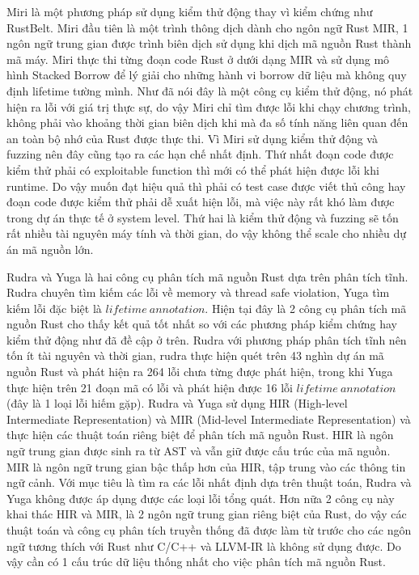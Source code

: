Miri là một phương pháp sử dụng kiểm thử động thay vì kiểm chứng như RustBelt.
Miri đầu tiên là một trình thông dịch dành cho ngôn ngữ Rust MIR, 1 ngôn ngữ trung gian được trình biên dịch sử dụng khi dịch mã nguồn Rust thành mã máy.
Miri thực thi từng đoạn code Rust ở dưới dạng MIR và sử dụng mô hình Stacked Borrow \cite{jung2019stacked} để lý giải cho những hành vi borrow dữ liệu mà không quy định lifetime tường mình.
Như đã nói đây là một công cụ kiểm thử động, nó phát hiện ra lỗi với giá trị thực sự, do vậy Miri chỉ tìm được lỗi khi chạy chương trình, không phải vào khoảng thời gian biên dịch khi mà đa số tính năng liên quan đến an toàn bộ nhớ của Rust được thực thi.
Vì Miri sử dụng kiểm thử động và fuzzing nên đây cũng tạo ra các hạn chế nhất định.
Thứ nhất đoạn code được kiểm thử phải có exploitable function thì mới có thể phát hiện được lỗi khi runtime.
Do vậy muốn đạt hiệu quả thì phải có test case được viết thủ công hay đoạn code được kiểm thử phải dễ xuất hiện lỗi, mà việc này rất khó làm được trong dự án thực tế ở system level.
Thứ hai là kiểm thử động và fuzzing sẽ tốn rất nhiều tài nguyên máy tính và thời gian, do vậy không thể scale cho nhiều dự án mã nguồn lớn.

Rudra và Yuga là hai công cụ phân tích mã nguồn Rust dựa trên phân tích tĩnh.
Rudra chuyên tìm kiếm các lỗi về memory và thread safe violation, Yuga tìm kiếm lỗi đặc biệt là $lifetime\ annotation$.
Hiện tại đây là 2 công cụ phân tích mã nguồn Rust cho thấy kết quả tốt nhất so với các phương pháp kiểm chứng hay kiểm thử động như đã đề cập ở trên.
Rudra với phương pháp phân tích tĩnh nên tốn ít tài nguyên và thời gian, rudra thực hiện quét trên 43 nghìn dự án mã nguồn Rust và phát hiện ra 264 lỗi chưa từng được phát hiện, trong khi Yuga thực hiện trên 21 đoạn mã có lỗi và phát hiện được 16 lỗi $lifetime\ annotation$ (đây là 1 loại lỗi hiếm gặp).
Rudra và Yuga sử dụng HIR (High-level Intermediate Representation) \cite{rustlangHighlevelRust} và MIR (Mid-level Intermediate Representation) \cite{rustlangMidlevelRust} và thực hiện các thuật toán riêng biệt để phân tích mã nguồn Rust.
HIR là ngôn ngữ trung gian được sinh ra từ AST và vẫn giữ được cấu trúc của mã nguồn.
MIR là ngôn ngữ trung gian bậc thấp hơn của HIR, tập trung vào các thông tin ngữ cảnh.
Với mục tiêu là tìm ra các lỗi nhất định dựa trên thuật toán, Rudra và Yuga không được áp dụng được các loại lỗi tổng quát.
Hơn nữa 2 công cụ này khai thác HIR và MIR, là 2 ngôn ngữ trung gian riêng biệt của Rust, do vậy các thuật toán và công cụ phân tích truyền thống đã được làm từ trước cho các ngôn ngữ tương thích với Rust như C/C++ và LLVM-IR là không sử dụng được.
Do vậy cần có 1 cấu trúc dữ liệu thống nhất cho việc phân tích mã nguồn Rust.

